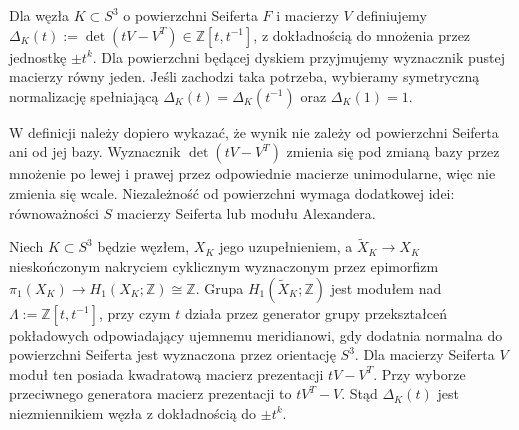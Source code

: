 \begin{definicja}
Dla węzła $K\subset S^3$ o powierzchni Seiferta $F$
i macierzy $V$ definiujemy
$\Delta_K(t):=\det(tV-V^T)\in\mathbb Z[t,t^{-1}]$,
z dokładnością do mnożenia przez jednostkę $\pm t^k$.
Dla powierzchni będącej dyskiem przyjmujemy wyznacznik pustej
macierzy równy jeden. Jeśli zachodzi taka potrzeba, wybieramy
symetryczną normalizację spełniającą
$\Delta_K(t)=\Delta_K(t^{-1})$ oraz $\Delta_K(1)=1$.
\end{definicja}

\begin{uwaga}
W definicji należy dopiero wykazać, że wynik nie zależy
od powierzchni Seiferta ani od jej bazy. Wyznacznik $\det(tV-V^T)$
zmienia się pod zmianą bazy przez mnożenie po lewej i prawej
przez odpowiednie macierze unimodularne, więc nie zmienia
się wcale. Niezależność od powierzchni wymaga dodatkowej idei:
równoważności $S$ macierzy Seiferta lub modułu Alexandera.
\end{uwaga}

\begin{twierdzenie}
Niech $K\subset S^3$ będzie węzłem, $X_K$ jego uzupełnieniem,
a $\widetilde X_K\to X_K$ nieskończonym nakryciem cyklicznym
wyznaczonym przez epimorfizm
$\pi_1(X_K)\to H_1(X_K;\mathbb Z)\cong\mathbb Z$.
Grupa $H_1(\widetilde X_K;\mathbb Z)$ jest modułem nad
$\Lambda:=\mathbb Z[t,t^{-1}]$, przy czym $t$ działa przez
generator grupy przekształceń pokładowych odpowiadający
ujemnemu meridianowi, gdy dodatnia normalna do powierzchni
Seiferta jest wyznaczona przez orientację $S^3$.
Dla macierzy Seiferta $V$ moduł ten posiada kwadratową
macierz prezentacji $tV-V^T$. Przy wyborze przeciwnego
generatora macierz prezentacji to $tV^T-V$. Stąd $\Delta_K(t)$ jest niezmiennikiem
węzła z dokładnością do $\pm t^k$.
\end{twierdzenie}

